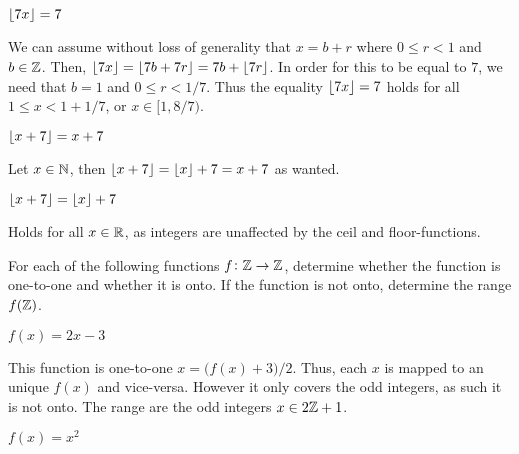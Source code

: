 \documentclass[a4paper, english, 12pt]{article} %
\begin{document}
\begin{subproblem}
  $\lfloor7x\rfloor = 7$
\end{subproblem}

\begin{answer}
  We can assume without loss of generality that $x = b +r$ where $0 \leq r < 1$
  and $b \in \mathbb{Z}$. Then, $\lfloor7x\rfloor = \lfloor7b + 7r\rfloor = 7b + \lfloor7r\rfloor$. In
  order for this to be equal to $7$, we need that $b = 1$ and $0 \leq r < 1/7$.
  Thus the equality $\lfloor7x\rfloor = 7$ holds for all $1 \leq x < 1 + 1/7$, or $x
  \in [1,8/7)$.
\end{answer}

\begin{subproblem}
  $\lfloor x + 7\rfloor = x + 7$
\end{subproblem}

\begin{answer}
  Let $x \in \mathbb{N}$, then $\lfloor x + 7\rfloor = \lfloor x\rfloor + 7 = x + 7$ as wanted.
\end{answer}

\begin{subproblem}
  $\lfloor x + 7\rfloor = \lfloor x\rfloor + 7$
\end{subproblem}

\begin{answer}
  Holds for all $x \in \mathbb{R}$, as integers are unaffected by the ceil and
  floor-functions. 
\end{answer}



\begin{problem}[2]
  For each of the following functions $f \colon \mathbb{Z} \to \mathbb{Z}$, determine whether
  the function is one-to-one and whether it is onto. If the function is not
  onto, determine the range $f(\mathbb{Z})$.
\end{problem}

\begin{subproblem}[2]
  $f(x) = 2x - 3$
\end{subproblem}

\begin{answer}
  This function is one-to-one $x = \bigl(  f(x) + 3 \bigr)/2$. Thus, each $x$ is
  mapped to an unique $f(x)$ and vice-versa. However it only covers the odd
  integers, as such it is not onto. The range are the odd integers $x \in 2\mathbb{Z} + 1$.
\end{answer}

\begin{subproblem}[4]
  $f(x) = x^2$
\end{subproblem}
\end{document}
